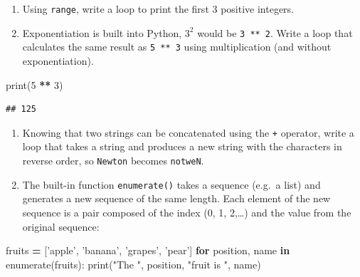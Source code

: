 \documentclass[]{book}
\newenvironment{Shaded}{\begin{snugshade}}{\end{snugshade}}
\newcommand{\BuiltInTok}[1]{#1}
\newcommand{\ControlFlowTok}[1]{\textcolor[rgb]{0.13,0.29,0.53}{\textbf{#1}}}
\newcommand{\DecValTok}[1]{\textcolor[rgb]{0.00,0.00,0.81}{#1}}
\newcommand{\KeywordTok}[1]{\textcolor[rgb]{0.13,0.29,0.53}{\textbf{#1}}}
\newcommand{\NormalTok}[1]{#1}
\newcommand{\OperatorTok}[1]{\textcolor[rgb]{0.81,0.36,0.00}{\textbf{#1}}}
\newcommand{\StringTok}[1]{\textcolor[rgb]{0.31,0.60,0.02}{#1}}
\theoremstyle{definition}
\theoremstyle{definition}
\theoremstyle{definition}
\theoremstyle{remark}
\begin{document}
\begin{enumerate}
\def\labelenumi{\arabic{enumi}.}
\item
  Using \texttt{range}, write a loop to print the first 3 positive
  integers.
\item
  Exponentiation is built into Python, \(3 ^ 2\) would be
  \texttt{3\ **\ 2}. Write a loop that calculates the same result as
  \texttt{5\ **\ 3} using multiplication (and without exponentiation).
\end{enumerate}

\begin{Shaded}
\begin{Highlighting}[]
\BuiltInTok{print}\NormalTok{(}\DecValTok{5} \OperatorTok{**} \DecValTok{3}\NormalTok{)}
\end{Highlighting}
\end{Shaded}

\begin{verbatim}
## 125
\end{verbatim}

\begin{enumerate}
\def\labelenumi{\arabic{enumi}.}
\setcounter{enumi}{2}
\item
  Knowing that two strings can be concatenated using the \texttt{+}
  operator, write a loop that takes a string and produces a new string
  with the characters in reverse order, so
  \texttt{\textquotesingle{}Newton\textquotesingle{}} becomes
  \texttt{\textquotesingle{}notweN\textquotesingle{}}.
\item
  The built-in function \texttt{enumerate()} takes a sequence (e.g.~a
  list) and generates a new sequence of the same length. Each element of
  the new sequence is a pair composed of the index (0, 1, 2,\ldots{})
  and the value from the original sequence:
\end{enumerate}

\begin{Shaded}
\begin{Highlighting}[]
\NormalTok{fruits }\OperatorTok{=}\NormalTok{ [}\StringTok{'apple'}\NormalTok{, }\StringTok{'banana'}\NormalTok{, }\StringTok{'grapes'}\NormalTok{, }\StringTok{'pear'}\NormalTok{]}
\ControlFlowTok{for}\NormalTok{ position, name }\KeywordTok{in} \BuiltInTok{enumerate}\NormalTok{(fruits):}
  \BuiltInTok{print}\NormalTok{(}\StringTok{"The "}\NormalTok{, position, }\StringTok{"fruit is "}\NormalTok{, name)}
\end{Highlighting}
\end{Shaded}
\end{document}
